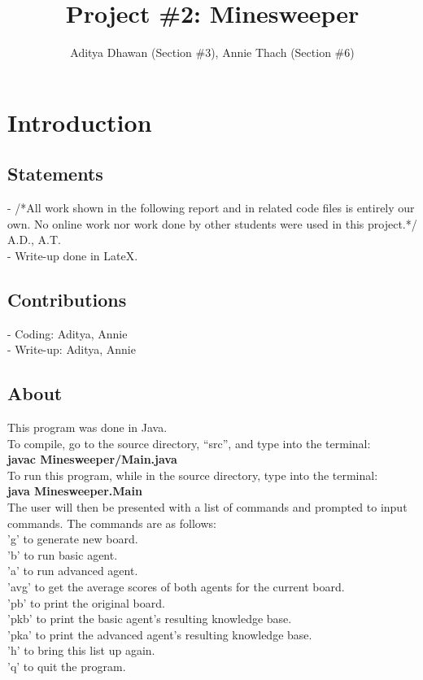 \documentclass[11pt]{article} %
\title{\textbf{Project \#2: Minesweeper}}
\author{Aditya Dhawan (Section \#3),  Annie Thach (Section \#6)}
\date{} %
\begin{document}
\maketitle

\section{\textbf{Introduction}}

\subsection{Statements}

- /*All work shown in the following report and in related code files is entirely our own. No online work nor work done by other students were used in this project.*/ A.D., A.T. \\- Write-up done in LateX.

\subsection{Contributions}

- Coding: Aditya, Annie
\\
- Write-up: Aditya, Annie

\subsection{About}

This program was done in Java.\\
To compile, go to the source directory, “src”, and type into the terminal:\\
\textbf{javac Minesweeper/Main.java}\\
To run this program, while in the source directory, type into the terminal:\\
\textbf{java Minesweeper.Main}\\
The user will then be presented with a list of commands and prompted to input commands. The commands are as follows:\\
'g' to generate new board.\\
'b' to run basic agent.\\
'a' to run advanced agent.\\
'avg' to get the average scores of both agents for the current board.\\
'pb' to print the original board.\\
'pkb' to print the basic agent's resulting knowledge base.\\
'pka' to print the advanced agent's resulting knowledge base.\\
'h' to bring this list up again.\\
'q' to quit the program.\\
\end{document}

